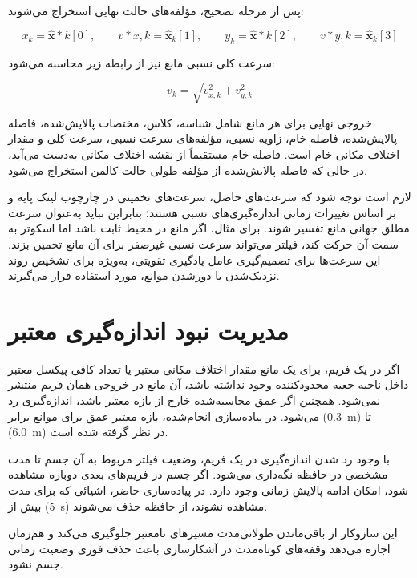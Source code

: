 پس از مرحله تصحیح، مؤلفه‌های حالت نهایی استخراج می‌شوند:

\begin{equation}
	x_k = \hat{\mathbf{x}}*k[0],
	\qquad
	v*{x,k} = \hat{\mathbf{x}}_k[1],
	\qquad
	y_k = \hat{\mathbf{x}}*k[2],
	\qquad
	v*{y,k} = \hat{\mathbf{x}}_k[3]
	\label{eq:app_kalman_output_components}
\end{equation}

سرعت کلی نسبی مانع نیز از رابطه زیر محاسبه می‌شود:

\begin{equation}
	v_k =
	\sqrt{
		v_{x,k}^{2}
		+
		v_{y,k}^{2}
	}
	\label{eq:app_kalman_speed}
\end{equation}

خروجی نهایی برای هر مانع شامل شناسه، کلاس، مختصات پالایش‌شده، فاصله پالایش‌شده، فاصله خام، زاویه نسبی، مؤلفه‌های سرعت نسبی، سرعت کلی و مقدار اختلاف مکانی خام است. فاصله خام مستقیماً از نقشه اختلاف مکانی به‌دست می‌آید، در حالی که فاصله پالایش‌شده از مؤلفه طولی حالت کالمن استخراج می‌شود.

لازم است توجه شود که سرعت‌های حاصل، سرعت‌های تخمینی در چارچوب لینک پایه و بر اساس تغییرات زمانی اندازه‌گیری‌های نسبی هستند؛ بنابراین نباید به‌عنوان سرعت مطلق جهانی مانع تفسیر شوند. برای مثال، اگر مانع در محیط ثابت باشد اما اسکوتر به سمت آن حرکت کند، فیلتر می‌تواند سرعت نسبی غیرصفر برای آن مانع تخمین بزند. این سرعت‌ها برای تصمیم‌گیری عامل یادگیری تقویتی، به‌ویژه برای تشخیص روند نزدیک‌شدن یا دورشدن موانع، مورد استفاده قرار می‌گیرند.

\section{مدیریت نبود اندازه‌گیری معتبر}

اگر در یک فریم، برای یک مانع مقدار اختلاف مکانی معتبر یا تعداد کافی پیکسل معتبر داخل ناحیه جعبه محدودکننده وجود نداشته باشد، آن مانع در خروجی همان فریم منتشر نمی‌شود. همچنین اگر عمق محاسبه‌شده خارج از بازه معتبر باشد، اندازه‌گیری رد می‌شود. در پیاده‌سازی انجام‌شده، بازه معتبر عمق برای موانع برابر (0.3~m) تا (6.0~m) در نظر گرفته شده است.

با وجود رد شدن اندازه‌گیری در یک فریم، وضعیت فیلتر مربوط به آن جسم تا مدت مشخصی در حافظه نگه‌داری می‌شود. اگر جسم در فریم‌های بعدی دوباره مشاهده شود، امکان ادامه پالایش زمانی وجود دارد. در پیاده‌سازی حاضر، اشیائی که برای مدت بیش از (5~s) مشاهده نشوند، از حافظه حذف می‌شوند.

این سازوکار از باقی‌ماندن طولانی‌مدت مسیرهای نامعتبر جلوگیری می‌کند و هم‌زمان اجازه می‌دهد وقفه‌های کوتاه‌مدت در آشکارسازی باعث حذف فوری وضعیت زمانی جسم نشود.

